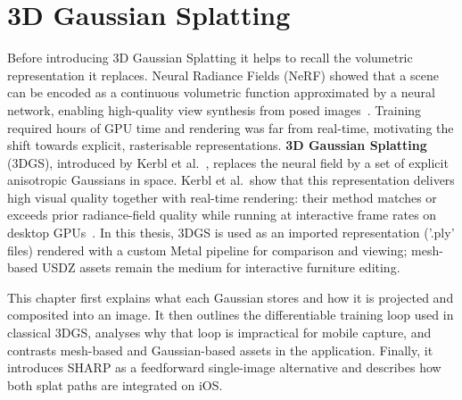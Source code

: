 
\chapter{3D Gaussian Splatting}
\label{ch:theory2}

Before introducing 3D Gaussian Splatting it helps to recall the volumetric
representation it replaces. Neural Radiance Fields (NeRF) showed that a scene can
be encoded as a continuous volumetric function approximated by a neural network,
enabling high-quality view synthesis from posed
images~\cite{mildenhall2020nerf}. Training required hours of GPU time and
rendering was far from real-time, motivating the shift towards explicit,
rasterisable representations. \textbf{3D Gaussian Splatting} (3DGS), introduced by Kerbl et al.\
\cite{kerbl20233dgs}, replaces the neural field by a set of explicit
anisotropic Gaussians in space. Kerbl et al.\ show that this representation delivers
high visual quality together with real-time rendering: their method matches
or exceeds prior radiance-field quality while running at interactive frame rates on
desktop GPUs~\cite{kerbl20233dgs}. In this thesis, 3DGS is used as an imported
representation ('.ply' files) rendered with a custom Metal pipeline for
comparison and viewing; mesh-based USDZ assets remain the medium for
interactive furniture editing.

This chapter first explains what each Gaussian stores and how it is projected and
composited into an image. It then outlines the differentiable training loop used in
classical 3DGS, analyses why that loop is impractical for mobile capture, and contrasts
mesh-based and Gaussian-based assets in the application. Finally, it introduces SHARP
as a feedforward single-image alternative and describes how both splat paths are
integrated on iOS.


% 


